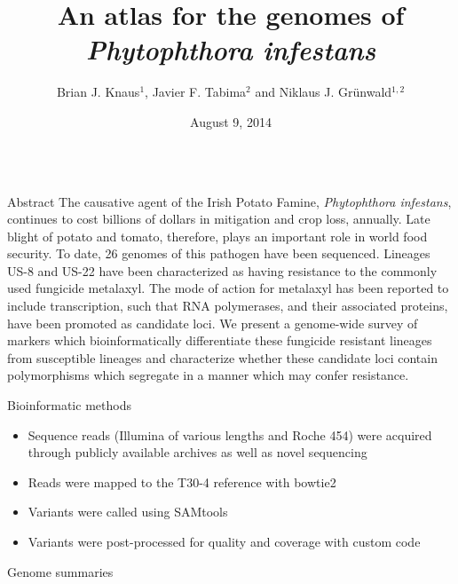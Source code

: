 \documentclass[final,t]{beamer}
\title{\huge An atlas for the genomes of\\ \emph{Phytophthora infestans}}
\author[Knaus et al.]{Brian J. Knaus$^{1}$, Javier F. Tabima$^{2}$ and Niklaus J. Gr\"{u}nwald$^{1, 2}$}
\institute[USDA-ARS, OSU, UCR]{$^{1}$Horticultural Crops Research Unit, USDA Agricultural Research Service\\ $^{2}$Department of Botany and Plant Pathology, Oregon State University}
\date[August 9, 2014]{August 9, 2014}
\begin{document}
\begin{frame}{} 
  \begin{columns}[t]
    \begin{column}{.28\linewidth}


      \begin{block}{Abstract}
The causative agent of the Irish Potato Famine, \emph{Phytophthora infestans}, continues to cost billions of dollars in mitigation and crop loss, annually.  Late blight of potato and tomato, therefore, plays an important role in world food security.  To date, 26 genomes of this pathogen have been sequenced.  Lineages US-8 and US-22 have been characterized as having resistance to the commonly used fungicide metalaxyl.  The mode of action for metalaxyl has been reported to include transcription, such that RNA polymerases, and their associated proteins, have been promoted as candidate loci.  We present a genome-wide survey of markers which bioinformatically differentiate these fungicide resistant lineages from susceptible lineages and characterize whether these candidate loci contain polymorphisms which segregate in a manner which may confer resistance.
      \end{block}


      
  \begin{block}{Bioinformatic methods}
    \begin{itemize}
      \item Sequence reads (Illumina of various lengths and Roche 454) were acquired through publicly available archives as well as novel sequencing
      \item Reads were mapped to the T30-4 reference with bowtie2
      \item Variants were called using SAMtools
      \item Variants were post-processed for quality and coverage with custom code
    \end{itemize}
  \end{block}

      \begin{block}{Genome summaries}


\end{block}
\end{column}
\end{columns}
\end{frame}
\end{document}
